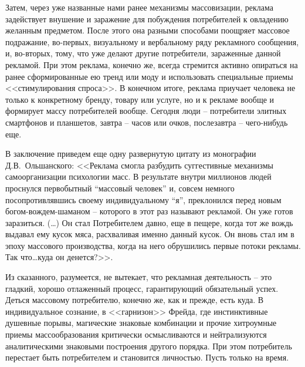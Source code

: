 Затем, через уже названные нами ранее механизмы массовизации, реклама задействует
внушение и заражение для побуждения потребителей к овладению желанным предметом.
После этого она разными способами поощряет массовое подражание, во-первых,
визуальному и вербальному ряду рекламного сообщения, и, во-вторых, тому,
что уже делают другие потребители, зараженные данной рекламой. При этом реклама,
конечно же, всегда стремится активно опираться на ранее сформированные ею тренд или
моду и использовать специальные приемы <<стимулирования спроса>>. В конечном итоге,
реклама приучает человека не только к конкретному бренду, товару или услуге,
но и к рекламе вообще и формирует массу потребителей вообще. Сегодня люди --
потребители элитных смартфонов и планшетов, завтра -- часов или очков, послезавтра --
чего-нибудь еще.

В заключение приведем еще одну развернутую цитату из монографии Д.В.~Ольшанского:
<<Реклама смогла разбудить суггестивные механизмы самоорганизации психологии масс.
В результате внутри миллионов людей проснулся первобытный ``массовый человек'' и,
совсем немного посопротивлявшись своему индивидуальному ``я'', преклонился перед
новым богом-вождем-шаманом -- которого в этот раз называют рекламой. Он уже готов
заразиться. (\ldots) Он стал Потребителем давно, еще в пещере, когда тот же вождь
выдавал ему кусок мяса, расхваливая именно данный кусок. Он вновь стал им в эпоху
массового производства, когда на него обрушились первые потоки рекламы.
Так что\ldots куда он денется?>>\autocite[][321]{olshansky}.

Из сказанного, разумеется, не вытекает, что рекламная деятельность -- это гладкий,
хорошо отлаженный процесс, гарантирующий обязательный успех. Деться массовому
потребителю, конечно же, как и прежде, есть куда. В индивидуальное сознание,
в <<гарнизон>> Фрейда, где инстинктивные душевные порывы, магические знаковые
комбинации и прочие хитроумные приемы массообразования критически осмысливаются и
нейтрализуются аналитическими знаковыми построения другого порядка.
При этом потребитель перестает быть потребителем и становится личностью.
Пусть только на время.


